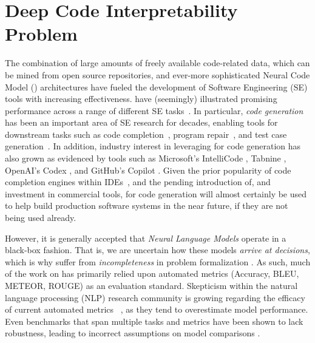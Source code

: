 
\section{Deep Code Interpretability Problem}
\label{sec:deep-interpret-problem}

The combination of large amounts of freely available code-related data, which can be mined from open source repositories, and ever-more sophisticated Neural Code Model (\nlm) architectures have fueled the development of Software Engineering (SE) tools with increasing effectiveness. \nlms have (seemingly) illustrated promising performance across a range of different SE tasks~\citep{Watson:ICSE20,White:MSR15,ciniselli2021empirical,Mastropaolo2021StudyingTasks}. In particular, \textit{code generation} has been an important area of SE research for decades, enabling tools for downstream tasks such as code completion~\citep{MSR-Completion}, program repair~\citep{Chen2019sequencer}, and test case generation~\citep{Watson:ICSE20}. In addition, industry interest in leveraging \nlms for code generation has also grown as evidenced by tools such as Microsoft's IntelliCode \citep{intellicode}, Tabnine \citep{tabnine}, OpenAI's Codex \citep{openai_codex}, and GitHub's Copilot \citep{github_copilot}. Given the prior popularity of code completion engines within IDEs~\citep{murphy2006ide}, and the pending introduction of, and investment in commercial tools, \nlms for code generation will almost certainly be used to help build production software systems in the near future, if they are not being used already.

However, it is generally accepted that \textit{Neural Language Models} operate in a black-box fashion. That is, we are uncertain how these models \textit{arrive at decisions}, which is why \nlms suffer from \textit{incompleteness} in problem formalization \citep{Doshi-Velez2017TowardsLearning}. As such, much of the work on \nlms has primarily relied upon automated metrics (\eg Accuracy, BLEU, METEOR, ROUGE) as an evaluation standard. Skepticism within the natural language processing (NLP) research community is growing regarding the efficacy of current automated metrics ~\citep{ribeiro2020checklist, rei2020comet, kocmi2021ship}, as they tend to overestimate model performance. Even benchmarks that span multiple tasks and metrics have been shown to lack robustness, leading to incorrect assumptions on model comparisons \citep{dehghani2021benchmark}. 

